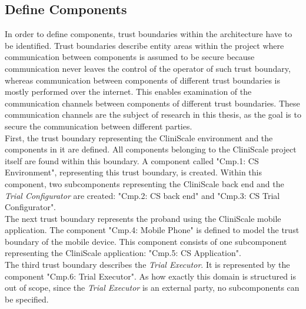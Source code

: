 \subsection{Define Components}
\label{designIdComp}
In order to define components, trust boundaries within the architecture have to be identified. Trust boundaries describe entity areas within the project where communication between components is assumed to be secure because communication never leaves the control of the operator of such trust boundary, whereas communication between components of different trust boundaries is mostly performed over the internet. This enables examination of the communication channels between components of different trust boundaries. These communication channels are the subject of research in this thesis, as the goal is to secure the communication between different parties.\\
\newline
First, the trust boundary representing the CliniScale environment and the components in it are defined. All components belonging to the CliniScale project itself are found within this boundary. A component called "Cmp.1: CS Environment", representing this trust boundary, is created. Within this component, two subcomponents representing the CliniScale back end and the \textit{Trial Configurator} are created: "Cmp.2: CS back end" and "Cmp.3: CS Trial Configurator".\\
\newline
The next trust boundary represents the proband using the CliniScale mobile application. The component "Cmp.4: Mobile Phone" is defined to model the trust boundary of the mobile device. This component consists of one subcomponent representing the CliniScale application: "Cmp.5: CS Application".\\
\newline
The third trust boundary describes the \textit{Trial Executor}. It is represented by the component "Cmp.6: Trial Executor". As how exactly this domain is structured is out of scope, since the \textit{Trial Executor} is an external party, no subcomponents can be specified.

